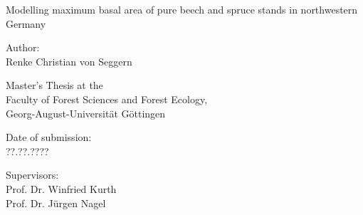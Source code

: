\begin{titlepage}

\begin{center}

\vspace*{5cm}

{\LARGE Modelling maximum basal area of pure beech and spruce stands in northwestern Germany \\}

\vspace{2cm}

{\large Author: \\ Renke Christian von Seggern \par}

\vspace{2cm}

{\normalsize Master’s Thesis at the \\
  Faculty of Forest Sciences and Forest Ecology, \\
  Georg-August-Universität Göttingen}

\vspace{0.5cm}

{\normalsize Date of submission: \\ ??.??.???? \par}

\vspace{0.5cm}

{\normalsize Supervisors: \\ Prof. Dr. Winfried Kurth \\ Prof. Dr. Jürgen Nagel \par}

\end{center}

\end{titlepage}


